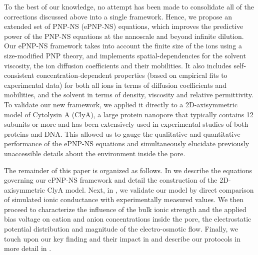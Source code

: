 \documentclass[journal=ancac3,manuscript=article,etalmode=truncate,maxauthors=0,layout=onecolumn]{achemso}
\begin{document}
To the best of our knowledge, no attempt has been made to consolidate all of the corrections discussed above
into a single framework. Hence, we propose an extended set of PNP-NS (ePNP-NS) equations, which improves the
predictive power of the PNP-NS equations at the nanoscale and beyond infinite dilution. Our ePNP-NS framework
takes into account the finite size of the ions using a size-modified PNP theory,\cite{Lu-2011} and implements
spatial-dependencies for the solvent viscosity,\cite{Pronk-2014,Hsu-2017} the ion diffusion coefficients and
their mobilities.\cite{Makarov-1998,Noskov-2004} It also includes self-consistent concentration-dependent
properties (based on empirical fits to experimental data) for both all ions in terms of diffusion coefficients
and mobilities,\cite{Baldessari-2008-1,Mills-1989} and the solvent in terms of density,
viscosity\cite{Hai-Lang-1996} and relative permittivity\cite{Gavish-2016}. To validate our new framework, we
applied it directly to a 2D-axisymmetric model of Cytolysin A (ClyA), a large protein nanopore that typically
contains 12 subunits\cite{Mueller-2009} or more\cite{Soskine-2013} and has been extensively used in
experimental studies of both proteins\cite{Soskine-2013,VanMeervelt-2014,Soskine-Biesemans-2015,
Biesemans-Soskine-2015,Wloka-2017,VanMeervelt-2017,Galenkamp-2018} and DNA.\cite{Franceschini-2013,
Franceschini-2016} This allowed us to gauge the qualitative and quantitative performance of the ePNP-NS
equations and simultaneously elucidate previously unaccessible details about the environment inside the pore.

The remainder of this paper is organized as follows. In \emph{} we describe the equations
governing our ePNP-NS framework and detail the construction of the 2D-axisymmetric ClyA model. Next, in
\emph{}, we validate our model by direct comparison of simulated ionic conductance with
experimentally measured values. We then proceed to characterize the influence of the bulk ionic strength and
the applied bias voltage on cation and anion concentrations inside the pore, the electrostatic potential
distribution and magnitude of the electro-osmotic flow. Finally, we touch upon our key finding and their
impact in \emph{} and describe our protocols in more detail in
\emph{}.
\end{document}
